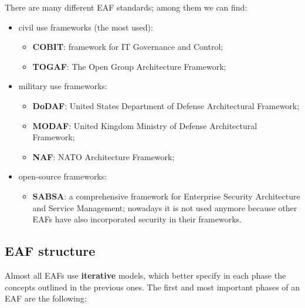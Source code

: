 There are many different EAF standards; among them we can find:

\begin{itemize}
\vspace{0.2em}
\item civil use frameworks (the most used):
\begin{itemize}
\item \textbf{COBIT}: framework for IT Governance and Control;
\item \textbf{TOGAF}: The Open Group Architecture Framework;
\end{itemize}
\vspace{0.2em}
\item military use frameworks:
\begin{itemize}
\item \textbf{DoDAF}: United States Department of Defense Architectural Framework;
\item \textbf{MODAF}: United Kingdom Ministry of Defense Architectural Framework;
\item \textbf{NAF}: NATO Architecture Framework;
\end{itemize}
\vspace{0.2em}
\item open-source frameworks:
\begin{itemize}
\item \textbf{SABSA}: a comprehensive framework for Enterprise Security Architecture and Service
Management; nowadays it is not used anymore because other EAFs have also incorporated security in their frameworks.
\end{itemize}
\end{itemize}


\subsection{EAF structure}

Almost all EAFs use \textbf{iterative} models, which better specify in each phase the concepts outlined in the previous ones. The first and most important phases of an EAF are the following:

